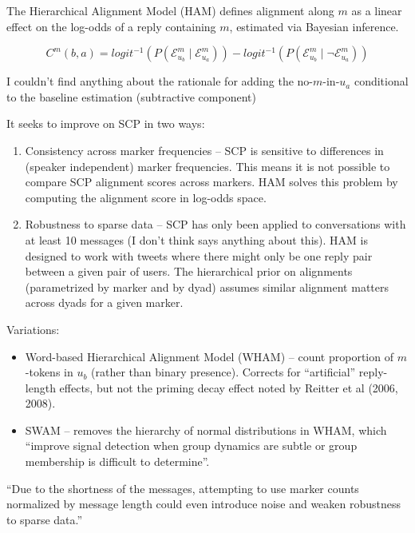 \documentclass[12pt]{scrartcl}
\newcommand{\bill}[1]{\textcolor{Dandelion}{#1}}
\begin{document}
The Hierarchical Alignment Model (HAM) \citep{doyle_investigating_2016} defines alignment along $m$ as a linear effect on the log-odds of a reply containing $m$, estimated via Bayesian inference.

\[
  C^m(b,a) = logit^{-1}(P(\mathcal{E}^m_{u_b} \mid \mathcal{E}^m_{u_a})) - logit^{-1}(P(\mathcal{E}^m_{u_b} \mid \lnot \mathcal{E}^m_{u_a}))
\]

\bill{I couldn't find anything about the rationale for adding the no-$m$-in-$u_a$ conditional to the baseline estimation (subtractive component)} 

It seeks to improve on SCP in two ways:
\begin{enumerate}
  \item Consistency across marker frequencies -- SCP is sensitive to differences in (speaker independent) marker frequencies. This means it is not possible to compare SCP alignment scores across markers. HAM solves this problem by computing the alignment score in log-odds space.
  \item Robustness to sparse data -- SCP has only been applied to conversations with at least 10 messages \bill{(I don't think  \cite{danescu-niculescu-mizil_echoes_2012} says anything about this)}. HAM is designed to work with tweets where there might only be one reply pair between a given pair of users. The hierarchical prior on alignments (parametrized by marker and by dyad) assumes similar alignment matters across dyads for a given marker. 
\end{enumerate}

Variations:
\begin{itemize}
  \item Word-based Hierarchical Alignment Model (WHAM) \citep{doyle_robust_2016} -- count proportion of $m$-tokens in $u_b$ (rather than binary presence). Corrects for ``artificial'' reply-length effects, but not the priming decay effect noted by Reitter et al (2006, 2008).
  \item SWAM \citep{shin_alignment_2018} -- removes the hierarchy of normal distributions in WHAM, which ``improve signal detection when group dynamics are subtle or group membership is difficult to determine''. 
\end{itemize}

``Due to the shortness of the messages, attempting to use marker counts normalized by message length could even introduce noise and weaken robustness to sparse data.''
\end{document}
